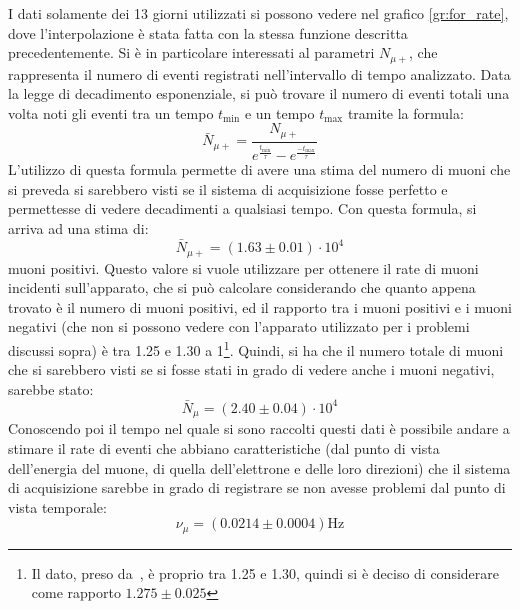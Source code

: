 I dati solamente dei 13 giorni utilizzati si possono vedere nel grafico \ref{gr:for_rate}, dove l'interpolazione è stata fatta con la stessa funzione descritta precedentemente. Si è in particolare interessati al parametri $N_{\mu+}$, che rappresenta il numero di eventi registrati nell'intervallo di tempo analizzato. Data la legge di decadimento esponenziale, si può trovare il numero di eventi totali una volta noti gli eventi tra un tempo $t_\text{min}$ e un tempo $t_\text{max}$  tramite la formula:
\begin{equation}
  \bar{N}_{\mu+} = \frac{N_{\mu+}}{e^{\frac{t_\text{min}}{\tau}}-e^{\frac{-t_\text{max}}{\tau}}}
\end{equation}
L'utilizzo di questa formula permette di avere una stima del numero di muoni che si preveda si sarebbero visti se il sistema di acquisizione fosse perfetto e permettesse di vedere decadimenti a qualsiasi tempo. Con questa formula, si arriva ad una stima di:
\begin{equation}
  \bar{N}_{\mu+} = (1.63 \pm 0.01) \cdot 10^4
\end{equation}
muoni positivi. Questo valore si vuole utilizzare per ottenere il rate di muoni incidenti sull'apparato, che si può calcolare considerando che quanto appena trovato è il numero di muoni positivi, ed il rapporto tra i muoni positivi e i muoni negativi (che non si possono vedere con l'apparato utilizzato per i problemi discussi sopra) è tra 1.25 e 1.30 a 1\footnote{Il dato, preso da~\cite{bib:Patrignani:2016xqp}, è proprio tra  1.25 e 1.30, quindi si è deciso di considerare come rapporto $1.275\pm0.025$}. Quindi, si ha che il numero totale di muoni che si sarebbero visti se si fosse stati in grado di vedere anche i muoni negativi, sarebbe stato:
\begin{equation}
  \bar{N}_{\mu} = (2.40 \pm 0.04) \cdot 10^4
\end{equation}
Conoscendo poi il tempo nel quale si sono raccolti questi dati è possibile andare a stimare il rate di eventi che abbiano caratteristiche (dal punto di vista dell'energia del muone, di quella dell'elettrone e delle loro direzioni) che il sistema di acquisizione sarebbe in grado di registrare se non avesse problemi dal punto di vista temporale:
\begin{equation}
  \nu_\mu = (0.0214 \pm 0.0004) \text{Hz}
\end{equation}
